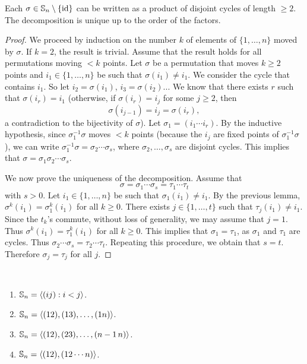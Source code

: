 \begin{theorem}
Each $\sigma\in\mathbb{S}_n\setminus\{\operatorname{id}\}$ can be written as a product
of disjoint cycles of length 
 $\geq2$. The decomposition is unique up to 
 the order of the factors. 
 \end{theorem}

\begin{proof}
    We proceed by induction on the number $k$ 
    of elements of $\{1,\dots,n\}$ moved by $\sigma$. If $k=2$, 
    the result is trivial. Assume that the result 
    holds for all permutations moving $<k$ points. Let
    $\sigma$ be a permutation that moves $k\geq2$ points and 
    $i_1\in\{1,\dots,n\}$ be such that $\sigma(i_1)\ne i_1$. We 
    consider the cycle that contains $i_1$. So let 
        $i_2=\sigma(i_1)$, $i_3=\sigma(i_2)$... We know that 
        there exists $r$ such that $\sigma(i_r)=i_1$
        (otherwise, if $\sigma(i_r)=i_j$ for some 
        $j\geq2$, then 
        \[
        \sigma(i_{j-1})=i_j=\sigma(i_r),
        \]
        a contradiction to the bijectivity of $\sigma$). 
        Let $\sigma_1=(i_1\cdots i_r)$. By the inductive hypothesis, since 
        $\sigma_1^{-1}\sigma$ moves $<k$ points (because 
        the $i_j$ are fixed points of $\sigma_1^{-1}\sigma$), 
        we can write $\sigma_1^{-1}\sigma=\sigma_2\cdots\sigma_s$, where 
        $\sigma_2,\dots,\sigma_s$ are disjoint cycles. 
        This implies that $\sigma=\sigma_1\sigma_2\cdots\sigma_s$.

        We now prove the uniqueness of the decomposition. 
        Assume that 
        \[
        \sigma=\sigma_1\cdots\sigma_s=\tau_1\cdots\tau
_t
\]
with $s>0$. Let $i_1\in\{1,\dots,n\}$ be such that 
        $\sigma_1(i_1)\ne i_1$. By the previous lemma, $\sigma^k(i_1)=\sigma_1^k(i_1)$ for all $k\geq0$.
        There exists $j\in\{1,\dots,t\}$ such that 
        $\tau_j(i_1)\ne i_1$. Since the $t_k$'s commute, 
        without loss of generality, we may assume that $j=
1$. Thus $\sigma^k(i_1)=\tau_1^k(i_1)$ for all $k\geq0$.  
This implies that 
        $\sigma_1=\tau_1$, as $\sigma_1$ and $\tau_1$ are cycles. 
        Thus $\sigma_2\cdots\sigma_s=\tau_2\cdots\tau_t$. Repeating
        this procedure, we obtain that $s=t$. Therefore 
        $\sigma_j=\tau_j$ for all $j$.
\end{proof}

\begin{corollary}\
\label{cor:generation}
        \begin{enumerate}
                \item $\mathbb{S}_n=\langle (ij):i<j\rangle$.
                \item $\mathbb{S}_n=\langle (12),(13),\dots,(1n)\rangle$.
                \item $\mathbb{S}_n=\langle (12),(23),\dots,(n-1\,n)\rangle$.
                \item $\mathbb{S}_n=\langle (12),(12\cdots n)\rangle$.
        \end{enumerate}
\end{corollary}

